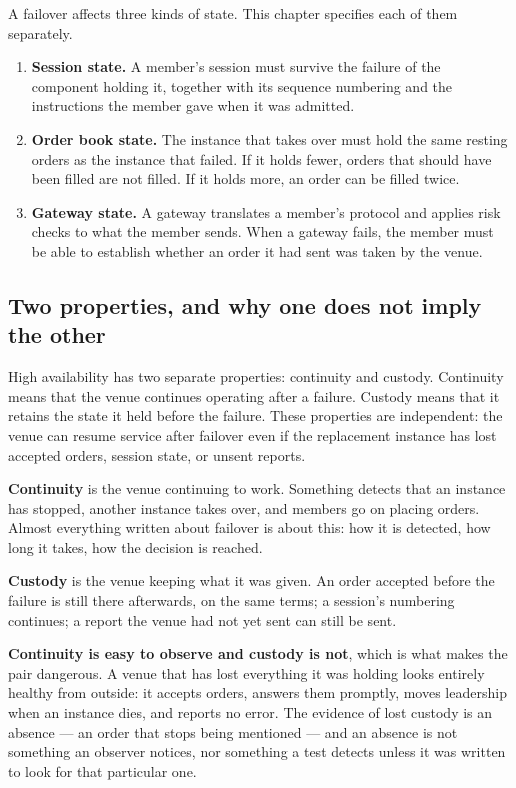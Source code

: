 A failover affects three kinds of state. This chapter specifies each of them
separately.

\begin{enumerate}
    \item \textbf{Session state.} A member's session must survive the failure of
      the component holding it, together with its sequence numbering and the instructions the member
      gave when it was admitted.
    \item \textbf{Order book state.} The instance that takes over must hold the
      same resting orders as the instance that failed. If it holds fewer, orders
      that should have been filled are not filled. If it holds more, an order can
      be filled twice.
    \item \textbf{Gateway state.} A gateway translates a member's protocol and
      applies risk checks to what the member sends. When a gateway fails, the
      member must be able to establish whether an order it had sent was taken by
      the venue.
\end{enumerate}

\subsection{Two properties, and why one does not imply the other}
\label{subsec:ha_two_properties}

High availability has two separate properties: continuity and custody.
Continuity means that the venue continues operating after a failure. Custody
means that it retains the state it held before the failure. These properties
are independent: the venue can resume service after failover even if the
replacement instance has lost accepted orders, session state, or unsent
reports.

\textbf{Continuity} is the venue continuing to work. Something detects that an
instance has stopped, another instance takes over, and members go on placing
orders. Almost everything written about failover is about this: how it is
detected, how long it takes, how the decision is reached.

\textbf{Custody} is the venue keeping what it was given. An order accepted before
the failure is still there afterwards, on the same terms; a session's numbering
continues; a report the venue had not yet sent can still be sent.

\textbf{Continuity is easy to observe and custody is not}, which is what makes
the pair dangerous. A venue that has lost everything it was holding looks
entirely healthy from outside: it accepts orders, answers them promptly, moves
leadership when an instance dies, and reports no error. The evidence of lost
custody is an absence --- an order that stops being mentioned --- and an absence
is not something an observer notices, nor something a test detects unless it was
written to look for that particular one.

